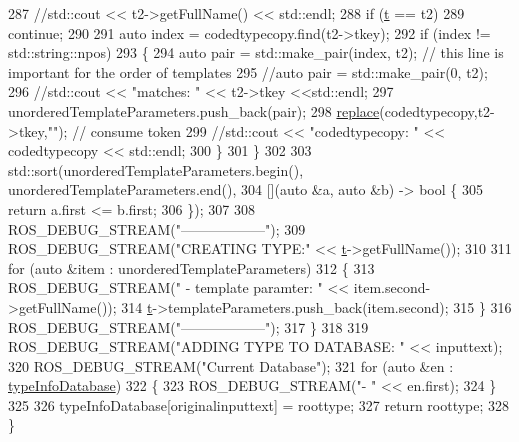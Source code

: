 \begin{DoxyCode}
287             \textcolor{comment}{//std::cout << t2->getFullName() << std::endl;}
288             \textcolor{keywordflow}{if} (\hyperlink{namespacebattery__monitor__node_a7a63d20d1ea461e280f4eb5b47f925cd}{t} == t2)
289                 \textcolor{keywordflow}{continue};
290 
291             \textcolor{keyword}{auto} index = codedtypecopy.find(t2->tkey);
292             \textcolor{keywordflow}{if} (index != std::string::npos)
293             \{
294                 \textcolor{keyword}{auto} pair = std::make\_pair(index, t2); \textcolor{comment}{// this line is important for the order of templates}
295                 \textcolor{comment}{//auto pair = std::make\_pair(0, t2);}
296                 \textcolor{comment}{//std::cout << "matches: " << t2->tkey <<std::endl;}
297                 unorderedTemplateParameters.push\_back(pair);
298                 \hyperlink{namespacesmacc_1_1introspection_a48571b9bf3b115d2a83cc0147c96d0bd}{replace}(codedtypecopy,t2->tkey,\textcolor{stringliteral}{""}); \textcolor{comment}{// consume token}
299                 \textcolor{comment}{//std::cout << "codedtypecopy: " << codedtypecopy << std::endl;}
300             \}
301         \}
302 
303         std::sort(unorderedTemplateParameters.begin(), unorderedTemplateParameters.end(),
304                   [](\textcolor{keyword}{auto} &a, \textcolor{keyword}{auto} &b) -> \textcolor{keywordtype}{bool} \{
305                       \textcolor{keywordflow}{return} a.first <= b.first;
306                   \});
307 
308         ROS\_DEBUG\_STREAM(\textcolor{stringliteral}{"------------------"});
309         ROS\_DEBUG\_STREAM(\textcolor{stringliteral}{"CREATING TYPE:"} << \hyperlink{namespacebattery__monitor__node_a7a63d20d1ea461e280f4eb5b47f925cd}{t}->getFullName());
310 
311         \textcolor{keywordflow}{for} (\textcolor{keyword}{auto} &item : unorderedTemplateParameters)
312         \{
313             ROS\_DEBUG\_STREAM(\textcolor{stringliteral}{" - template paramter: "} << item.second->getFullName());
314             \hyperlink{namespacebattery__monitor__node_a7a63d20d1ea461e280f4eb5b47f925cd}{t}->templateParameters.push\_back(item.second);
315         \}
316         ROS\_DEBUG\_STREAM(\textcolor{stringliteral}{"------------------"});
317     \}
318 
319     ROS\_DEBUG\_STREAM(\textcolor{stringliteral}{"ADDING TYPE TO DATABASE: "} << inputtext);
320     ROS\_DEBUG\_STREAM(\textcolor{stringliteral}{"Current Database"});
321     \textcolor{keywordflow}{for} (\textcolor{keyword}{auto} &en : \hyperlink{classsmacc_1_1introspection_1_1TypeInfo_ab780c03206b824aaf338135d16b0eff4}{typeInfoDatabase})
322     \{
323         ROS\_DEBUG\_STREAM(\textcolor{stringliteral}{"- "} << en.first);
324     \}
325 
326     typeInfoDatabase[originalinputtext] = roottype;
327     \textcolor{keywordflow}{return} roottype;
328 \}
\end{DoxyCode}
